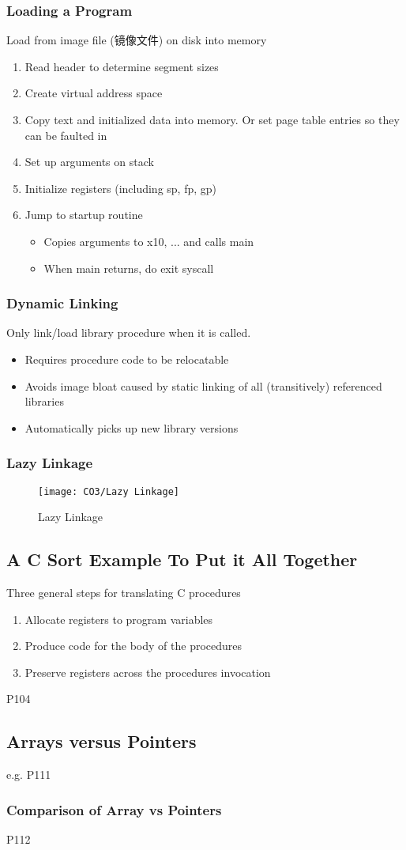 \subsubsection{Loading a Program}
Load from image file (镜像文件) on disk into memory
\begin{enumerate}
    \item Read header to determine segment sizes
    \item Create virtual address space
    \item Copy text and initialized data into memory. Or set page table entries so they can be faulted in
    \item Set up arguments on stack
    \item Initialize registers (including sp, fp, gp)
    \item Jump to startup routine
    \begin{itemize}
        \item Copies arguments to x10, ... and calls main
        \item When main returns, do exit syscall
    \end{itemize}
\end{enumerate}

\subsubsection{Dynamic Linking}
Only link/load library procedure when it is called. 
\begin{itemize}
    \item Requires procedure code to be relocatable
    \item Avoids image bloat caused by static linking of all (transitively) referenced libraries
    \item Automatically picks up new library versions
\end{itemize}

\subsubsection{Lazy Linkage}
\begin{figure}[!htb]
    \centering
    \texttt{[image: CO3/Lazy Linkage]}
    \caption{Lazy Linkage}
\end{figure}


\subsection{A C Sort Example To Put it All Together}
Three general steps for translating C procedures
\begin{enumerate}
    \item Allocate registers to program variables
    \item Produce code for the body of the procedures
    \item Preserve registers across the procedures invocation
\end{enumerate}

P104

\subsection{Arrays versus Pointers}
e.g. P111

\subsubsection{Comparison of Array vs Pointers}
P112


